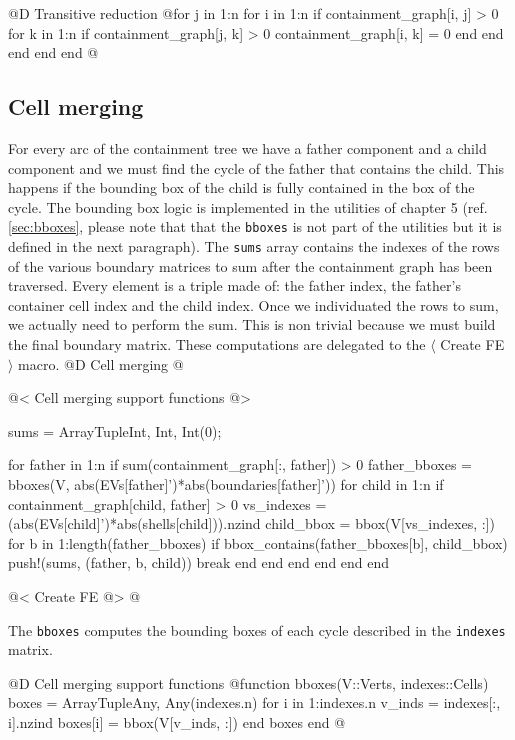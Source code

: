 \documentclass[10pt]{book}
\begin{document}
@D Transitive reduction
@{for j in 1:n
    for i in 1:n
        if containment_graph[i, j] > 0
            for k in 1:n
                if containment_graph[j, k] > 0
                    containment_graph[i, k] = 0
                end
            end
        end
    end
end
@}

\subsection{Cell merging}

For every arc of the containment tree we have a father component 
and a child component and we must find the cycle of the father that
contains the child. This happens if the bounding box of the child is fully
contained in the box of the cycle. The bounding box logic is implemented
in the utilities of chapter 5 (ref. \ref{sec:bboxes}, please note that
that the \texttt{bboxes} is not part of the utilities but it is defined 
in the next paragraph). The \texttt{sums} array contains the indexes of 
the rows of the various boundary matrices to sum after the containment 
graph has been traversed. Every element is a triple made of: the father 
index, the father's container cell index and the child index.
Once we individuated the rows to sum, we actually need to perform the sum.
This is non trivial because we must build the final boundary matrix.
These computations are delegated to the $\langle$ Create FE $\rangle$ macro.
@D Cell merging
@{@< Cell merging support functions @>

sums = Array{Tuple{Int, Int, Int}}(0);

for father in 1:n
    if sum(containment_graph[:, father]) > 0
        father_bboxes = bboxes(V, abs(EVs[father]')*abs(boundaries[father]'))
        for child in 1:n
            if containment_graph[child, father] > 0
                vs_indexes = (abs(EVs[child]')*abs(shells[child])).nzind
                child_bbox = bbox(V[vs_indexes, :])
                for b in 1:length(father_bboxes)
                    if bbox_contains(father_bboxes[b], child_bbox)
                        push!(sums, (father, b, child))
                        break
                    end
                end
            end            
        end
    end
end

@< Create FE @>
@}

The \texttt{bboxes} computes the bounding boxes of each cycle
described in the \texttt{indexes} matrix.

@D Cell merging support functions
@{function bboxes(V::Verts, indexes::Cells)
    boxes = Array{Tuple{Any, Any}}(indexes.n)
    for i in 1:indexes.n
        v_inds = indexes[:, i].nzind
        boxes[i] = bbox(V[v_inds, :])
    end
    boxes
end
@}
\end{document}
